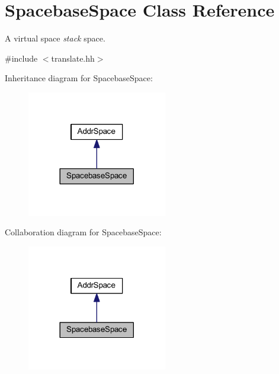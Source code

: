 \hypertarget{class_spacebase_space}{}\section{Spacebase\+Space Class Reference}
\label{class_spacebase_space}


A virtual space {\itshape stack} space.  




{\ttfamily \#include $<$translate.\+hh$>$}



Inheritance diagram for Spacebase\+Space\+:
\nopagebreak
\begin{figure}[H]
\begin{center}
\leavevmode
\includegraphics[width=173pt]{class_spacebase_space__inherit__graph}
\end{center}
\end{figure}


Collaboration diagram for Spacebase\+Space\+:
\nopagebreak
\begin{figure}[H]
\begin{center}
\leavevmode
\includegraphics[width=173pt]{class_spacebase_space__coll__graph}
\end{center}
\end{figure}
